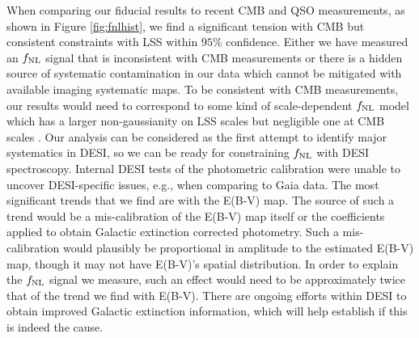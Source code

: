 When comparing our fiducial results to recent CMB and QSO measurements, as shown in Figure \ref{fig:fnlhist}, we find a significant tension with CMB but consistent constraints with LSS within $95\%$ confidence. Either we have measured an $f_{\rm NL}$ signal that is inconsistent with CMB measurements or there is a hidden source of systematic contamination in our data which cannot be mitigated with available imaging systematic maps. To be consistent with CMB measurements, our results would need to correspond to some kind of scale-dependent $f_{\rm NL}$ model which has a larger non-gaussianity on LSS scales but negligible one at CMB scales \citep{sefusatti_2009, becker_2011}. Our analysis can be considered as the first attempt to identify major systematics in DESI, so we can be ready for constraining $f_{\rm NL}$ with DESI spectroscopy. Internal DESI tests of the photometric calibration were unable to uncover DESI-specific issues, e.g., when comparing to Gaia data. The most significant trends that we find are with the E(B-V) map. The source of such a trend would be a mis-calibration of the E(B-V) map itself or the coefficients applied to obtain Galactic extinction corrected photometry. Such a mis-calibration would plausibly be proportional in amplitude to the estimated E(B-V) map, though it may not have E(B-V)’s spatial distribution. In order to explain the $f_{\rm NL}$ signal we measure, such an effect would need to be approximately twice that of the trend we find with E(B-V). There are ongoing efforts within DESI to obtain improved Galactic extinction information, which will help establish if this is indeed the cause.